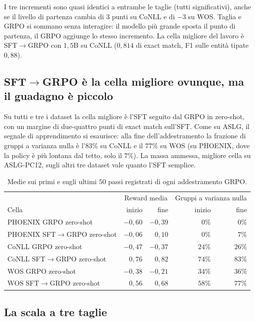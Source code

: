 I tre incrementi sono quasi identici a entrambe le taglie (tutti significativi),
anche se il livello di partenza cambia di $3$ punti su CoNLL e di $-3$ su WOS.
Taglia e GRPO si sommano senza interagire: il modello più grande sposta il punto
di partenza, il GRPO aggiunge lo stesso incremento. La cella migliore del lavoro
è SFT$\to$GRPO con $1{,}5$B su CoNLL ($0{,}814$ di exact match, F1 sulle entità
tipate $0{,}88$).

\subsection{SFT$\to$GRPO è la cella migliore ovunque, ma il guadagno è piccolo}

Su tutti e tre i dataset la cella migliore è l'SFT seguito dal GRPO in
zero-shot, con un margine di due-quattro punti di exact match sull'SFT. Come
su ASLG, il segnale di apprendimento si esaurisce: alla fine dell'addestramento
la frazione di gruppi a varianza nulla è l'$83\%$ su CoNLL e il $77\%$ su WOS
(su PHOENIX, dove la policy è più lontana dal tetto, solo il $7\%$). La massa
ammessa, migliore cella su ASLG-PC12, sugli altri tre dataset vale quanto l'SFT
semplice.

\begin{table}[h]
\centering
\small
\begin{tabular}{lrrrr}
\toprule
 & \multicolumn{2}{c}{Reward media} & \multicolumn{2}{c}{Gruppi a varianza nulla} \\
Cella & inizio & fine & inizio & fine \\
\midrule
PHOENIX GRPO zero-shot        & $-0{,}60$ & $-0{,}39$ & $0\%$  & $0\%$  \\
PHOENIX SFT$\to$GRPO zero-shot & $-0{,}06$ & $0{,}10$ & $0\%$  & $7\%$  \\
CoNLL GRPO zero-shot          & $-0{,}47$ & $-0{,}37$ & $24\%$ & $26\%$ \\
CoNLL SFT$\to$GRPO zero-shot  & $0{,}76$ & $0{,}82$  & $74\%$ & $83\%$ \\
WOS GRPO zero-shot            & $-0{,}38$ & $-0{,}21$ & $34\%$ & $36\%$ \\
WOS SFT$\to$GRPO zero-shot    & $0{,}56$ & $0{,}68$  & $58\%$ & $77\%$ \\
\bottomrule
\end{tabular}
\caption{Medie sui primi e sugli ultimi $50$ passi registrati di ogni
addestramento GRPO.}
\label{tab:dinamica-altri}
\end{table}

\subsection{La scala a tre taglie}
\label{sec:tre-taglie}

